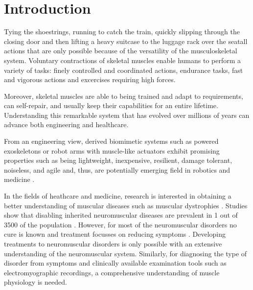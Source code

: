 \chapter{Introduction}\label{chap:introduction}




Tying the shoestrings, running to catch the train, quickly slipping through the closing door and then lifting a heavy suitcase to the luggage rack over the seat\textemdash all actions that are only possible because of the versatility of the musculoskeletal system.
Voluntary contractions of skeletal muscles enable humans to perform a variety of tasks: finely controlled and coordinated actions, endurance tasks, fast and vigorous actions and excercises requiring high forces.

Moreover, skeletal muscles are able to being trained and adapt to requirements, can self-repair, and usually keep their capabilities for an entire lifetime. Understanding this remarkable system that has evolved over millions of years can advance both engineering and healthcare.

From an engineering view, derived biomimetic systems such as powered exoskeletons or robot arms with muscle-like actuators exhibit promising properties such as being lightweight, inexpensive, resilient, damage tolerant, noiseless, and agile and, thus, are potentially emerging field in robotics and medicine \cite{BarCohen2003,BarCohen2004Electroactivepolymer,Mirvakili2018}.

In the fields of heathcare and medicine, research is interested in obtaining a better understanding of muscular diseases such as muscular dystrophies \cite{Emery2002}. Studies show that disabling inherited neuromuscular diseases are prevalent in 1 out of 3500 of the population \cite{Emery1991}. However, for most of the neuromuscular disorders no cure is known and treatment focusses on reducing symptoms \cite{Emery2002,Heidlauf2015Diss}. Developing treatments to neuromuscular disorders is only possible with an extensive understanding of the neuromuscular system. Similarly, for diagnosing the type of disorder from symptoms and clinically available examination tools such as electromyographic recordings, a comprehensive understanding of muscle physiology is needed.


